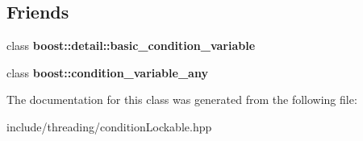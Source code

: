 \subsection*{Friends}
\begin{DoxyCompactItemize}
\item 
\hypertarget{classcore_1_1threading_1_1_condition_a960b4d1074af5f7c817e06fe4edf74be}{class {\bfseries boost\-::detail\-::basic\-\_\-condition\-\_\-variable}}\label{classcore_1_1threading_1_1_condition_a960b4d1074af5f7c817e06fe4edf74be}

\item 
\hypertarget{classcore_1_1threading_1_1_condition_aabf62dfc5fab1b22d10aa7e4d69c59a0}{class {\bfseries boost\-::condition\-\_\-variable\-\_\-any}}\label{classcore_1_1threading_1_1_condition_aabf62dfc5fab1b22d10aa7e4d69c59a0}

\end{DoxyCompactItemize}


The documentation for this class was generated from the following file\-:\begin{DoxyCompactItemize}
\item 
include/threading/condition\-Lockable.\-hpp\end{DoxyCompactItemize}
